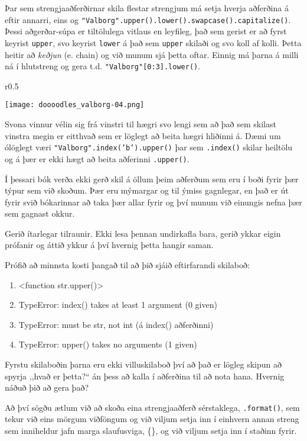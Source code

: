 Þar sem strengjaaðferðirnar skila flestar strengjum má setja hverja aðferðina á eftir annarri, eins og \texttt{"Valborg".upper().lower().swapcase().capitalize()}.
Þessi aðgerðar-súpa er tiltölulega vitlaus en leyfileg, það sem gerist er að fyrst keyrist \texttt{upper}, svo keyrist \texttt{lower} á það sem \texttt{upper} skilaði og svo koll af kolli.
Þetta heitir að \textit{keðjun} (e. chain) og við munum sjá þetta oftar.
Einnig má þarna á milli ná í hlutstreng og gera t.d. \texttt{"Valborg"[0:3].lower()}.
\begin{wrapfigure}{r}{0.5\textwidth}
	\begin{center}
		\texttt{[image: doooodles\_valborg-04.png]}
	\end{center}
\end{wrapfigure}
Svona vinnur vélin sig frá vinstri til hægri svo lengi sem að það sem skilast vinstra megin er eitthvað sem er löglegt að beita hægri hliðinni á.
Dæmi um ólöglegt væri \texttt{"Valborg".index('b').upper()} þar sem \texttt{.index()} skilar heiltölu og á þær er ekki hægt að beita aðferinni \texttt{.upper()}.

Í þessari bók verða ekki gerð skil á öllum þeim aðferðum sem eru í boði fyrir þær týpur sem við skoðum.
Þær eru mýmargar og til ýmiss gagnlegar, en það er út fyrir svið bókarinnar að taka þær allar fyrir og því munum við einungis nefna þær sem gagnast okkur.

Gerið ítarlegar tilraunir.
Ekki lesa þennan undirkafla bara, gerið ykkar eigin prófanir og áttið ykkur á því hvernig þetta hangir saman.


Prófið að minnsta kosti þangað til að þið sjáið eftirfarandi skilaboð:
\begin{enumerate}
	\item <function str.upper()> 
	\item TypeError: index() takes at least 1 argument (0 given)
	\item TypeError: must be str, not int (á index() aðferðinni)
	\item TypeError: upper() takes no arguments (1 given)
\end{enumerate}

Fyrstu skilaboðin þarna eru ekki villuskilaboð því að það er lögleg skipun að spyrja ,,hvað er þetta?“ án þess að kalla í aðferðina til að nota hana.
Hvernig náðuð þið að gera það? 


Að því sögðu ætlum við að skoða eina strengjaaðferð sérstaklega, \texttt{.format()}, sem tekur við eins mörgum viðföngum og við viljum setja inn í einhvern annan streng sem inniheldur jafn marga slaufusviga, \{\}, og við viljum setja inn í staðinn fyrir.

